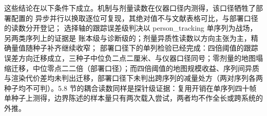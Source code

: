 这些结论在以下条件下成立。机制与剂量读数在仪器口径内测得，该口径牺牲了部署配置的
异步并行以换取逐位可复现，其绝对值不与文献表格可比，与部署口径的读数分开登记；
选择轴的跟踪误差级判决以 person\_tracking 单序列为战场，另两类序列上的证据是
账本级与诊断级的；剂量异质性读数以方向主张为主，精确量值随种子补齐继续收窄；
部署口径下的单列检验已经完成：四倍阈值的跟踪误差方向迁移成立，三种子中位负二点二厘米、与仪器口径同号；零剂量的地图塌缩迁移，中位零点二二倍（部署口径）；而四倍阈值的地图规模收益、序列间异质与渲染代价差均未判出迁移，部署口径下未判出跨序列的减量处方（两对序列各两种子均不可判）。5.8 节的耦合读数同样是探针级证据：复用开销在单序列四十帧单种子上测得，边界陈述的样本量只有两次载入尝试，两者均不作全长或跨系统的外推。







